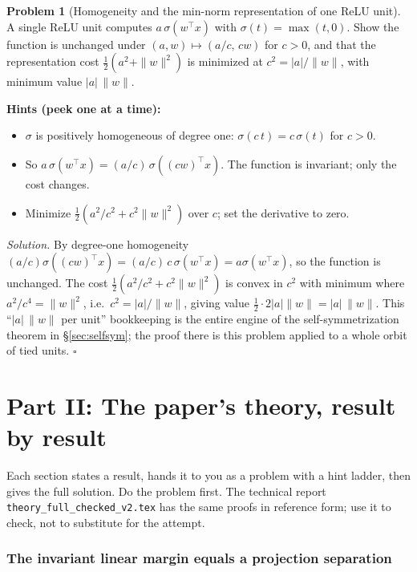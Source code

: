 \documentclass[11pt]{article}
\theoremstyle{plain}
\theoremstyle{definition}
\newtheorem{problem}{Problem}[section]
\theoremstyle{remark}
\newenvironment{hints}{\par\smallskip\noindent\textbf{\color{hintc}Hints (peek one at a time):}\begin{itemize}}{\end{itemize}\par\smallskip}
\newenvironment{solution}{\par\smallskip\noindent\textit{Solution.}\;}{\hfill$\square$\par\smallskip}
\begin{document}
\begin{problem}[Homogeneity and the min-norm representation of one ReLU unit]\label{pr:relu}
A single ReLU unit computes $a\,\sigma(w^\top x)$ with $\sigma(t)=\max(t,0)$. Show the function is unchanged under
$(a,w)\mapsto(a/c,\,cw)$ for $c>0$, and that the representation cost $\tfrac12(a^2+\|w\|^2)$ is minimized at
$c^2=|a|/\|w\|$, with minimum value $|a|\,\|w\|$.
\end{problem}
\begin{hints}
\item $\sigma$ is positively homogeneous of degree one: $\sigma(c\,t)=c\,\sigma(t)$ for $c>0$.
\item So $a\,\sigma(w^\top x)=(a/c)\,\sigma((cw)^\top x)$. The function is invariant; only the cost changes.
\item Minimize $\tfrac12(a^2/c^2+c^2\|w\|^2)$ over $c$; set the derivative to zero.
\end{hints}
\begin{solution}
By degree-one homogeneity $(a/c)\sigma((cw)^\top x)=(a/c)\,c\,\sigma(w^\top x)=a\sigma(w^\top x)$, so the function is
unchanged. The cost $\tfrac12(a^2/c^2+c^2\|w\|^2)$ is convex in $c^2$ with minimum where
$a^2/c^4=\|w\|^2$, i.e.\ $c^2=|a|/\|w\|$, giving value $\tfrac12\cdot2|a|\|w\|=|a|\,\|w\|$. This ``$|a|\,\|w\|$ per
unit'' bookkeeping is the entire engine of the self-symmetrization theorem in \S\ref{sec:selfsym}; the proof there is
this problem applied to a whole orbit of tied units.
\end{solution}

\part*{Part II: The paper's theory, result by result}

Each section states a result, hands it to you as a problem with a hint ladder, then gives the full solution. Do the
problem first. The technical report \texttt{theory\_full\_checked\_v2.tex} has the same proofs in reference form; use
it to check, not to substitute for the attempt.

\section{The invariant linear margin equals a projection separation}\label{sec:thmA}
\end{document}
